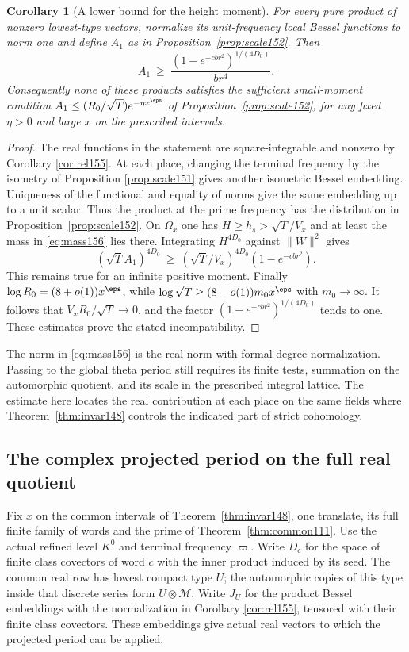 \documentclass[a4paper,11pt]{article}
\newtheorem{corollary}[proposition]{Corollary}
\theoremstyle{definition}
\theoremstyle{remark}
\numberwithin{equation}{section}
\begin{document}
\begin{corollary}[A lower bound for the height moment]
\label{cor:mom156}
For every pure product of nonzero lowest-type vectors, normalize
its unit-frequency local Bessel functions to norm one and
define \(A_1\) as in Proposition~\ref{prop:scale152}. Then
\[
       A_1\ \ge\
        \frac{(1-e^{-c b r^2})^{1/(4D_0)}}{b r^4}.
\]
Consequently none of these products satisfies the sufficient
small-moment condition \(A_1\le (R_0/\sqrt T)e^{-\eta x^\eps}\)
of Proposition~\ref{prop:scale152}, for any fixed \(\eta>0\)
and large \(x\) on the prescribed intervals.
\end{corollary}
\begin{proof}
The real functions in the statement are square-integrable and
nonzero by Corollary \ref{cor:rel155}. At each place, changing
the terminal frequency by the isometry of Proposition \ref{prop:scale151} gives another isometric Bessel embedding.
Uniqueness of the functional and equality of norms give the
same embedding up to a unit scalar. Thus the product at the
prime frequency has the distribution in
Proposition~\ref{prop:scale152}. On \(\Omega_x\) one has
\(H\ge h_s>\sqrt T/V_x\) and at least the mass in
\eqref{eq:mass156} lies there. Integrating \(H^{4D_0}\)
against \(\|W\|^2\) gives
\[
   (\sqrt T A_1)^{4D_0}
     \ \ge\ (\sqrt T/V_x)^{4D_0}(1-e^{-c b r^2}).
\]
This remains true for an infinite positive moment.
Finally \(\log R_0=(8+o(1))x^\eps\), while
\(\log\sqrt T\ge(8-o(1))m_0 x^\eps\) with \(m_0\to\infty\).
It follows that \(V_x R_0/\sqrt T\to0\), and the factor
\((1-e^{-c b r^2})^{1/(4D_0)}\) tends to one. These
estimates prove the stated incompatibility.
\end{proof}

The norm in \eqref{eq:mass156} is the real norm with formal
degree normalization. Passing to the global theta period still
requires its finite tests, summation on the automorphic quotient,
and its scale in the prescribed integral lattice. The estimate
here locates the real contribution at each place on the same
fields where Theorem~\ref{thm:invar148} controls the indicated
part of strict cohomology.

\subsection{The complex projected period on the full real quotient}\label{nav:VII-26}
Fix \(x\) on the common intervals of Theorem~\ref{thm:invar148},
one translate, its full finite family of words and the prime
of Theorem~\ref{thm:common111}. Use the actual refined level
\(K^0\) and terminal frequency \(\varpi\).
Write \(D_c\) for the space of finite class covectors of word
\(c\) with the inner product induced by its seed. The common
real row has lowest compact type \(U\); the automorphic copies
of this type inside that discrete series form \(U\otimes\mathcal M\).
Write \(J_U\) for the product Bessel embeddings with the
normalization in Corollary \ref{cor:rel155}, tensored with
their finite class covectors. These embeddings give actual
real vectors to which the projected period can be applied.
\end{document}
